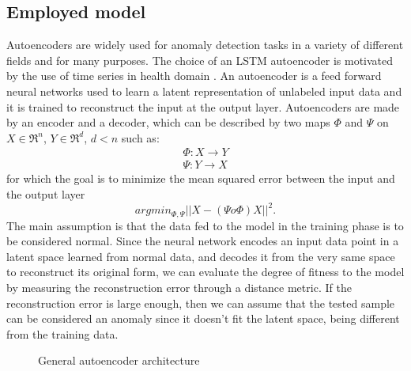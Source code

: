 \documentclass{article}
\begin{document}
\begin{multicols*}{2}
		\section{Employed model}
		\label{model}
		Autoencoders are widely used for anomaly detection tasks in a variety of different fields and for many purposes. 
		The choice of an LSTM autoencoder is motivated by the use of time series in health domain \cite{VitalDB}.
		An autoencoder is a feed forward neural networks used to learn a latent representation of unlabeled input data and it is trained to reconstruct the input at the output layer.
		Autoencoders are made by an encoder and a decoder, which can be described by two maps $\Phi$  and $\Psi$ on $X \in \Re^n$, $Y \in \Re^d$, $d < n$ such as:
		\begin{align*}
			\Phi : X \rightarrow  Y \\
			\Psi : Y \rightarrow  X  
		\end{align*}
		for which the goal is to minimize the mean squared error between the input and the output layer
		\begin{equation*}
			argmin_{\Phi,\Psi}|| X -  (\Psi  o \Phi) X ||^2.
		\end{equation*}
		The main assumption is that the data fed to the model in the training phase is to be considered normal.
		Since the neural network encodes an input data point in a latent space learned from normal data, and decodes it from the very same space to reconstruct its original form, we can evaluate the degree of fitness to the model by measuring the reconstruction error through a distance metric.  If the reconstruction error is large enough,  then we can assume that the tested sample can be considered an anomaly since it doesn't fit the latent space, being different from the training data.
		
		\begin{figure}[H]
			\centering
			\caption{General autoencoder architecture}
		\end{figure}
		

\end{multicols*}
\end{document}
